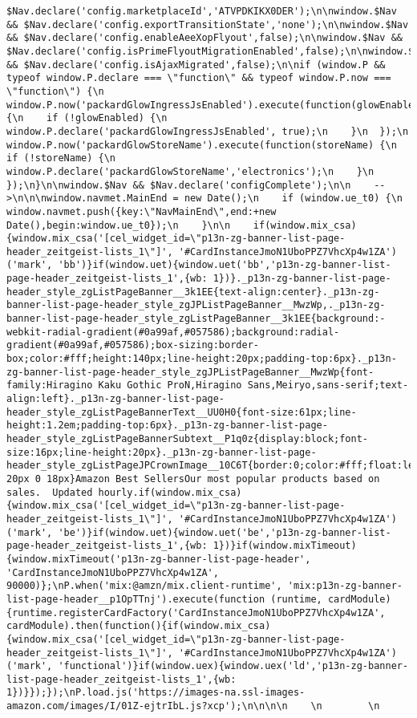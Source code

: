 \documentclass[
]{article}
\begin{document}
\begin{verbatim}
$Nav.declare('config.marketplaceId','ATVPDKIKX0DER');\n\nwindow.$Nav && $Nav.declare('config.exportTransitionState','none');\n\nwindow.$Nav && $Nav.declare('config.enableAeeXopFlyout',false);\n\nwindow.$Nav && $Nav.declare('config.isPrimeFlyoutMigrationEnabled',false);\n\nwindow.$Nav && $Nav.declare('config.isAjaxMigrated',false);\n\nif (window.P && typeof window.P.declare === \"function\" && typeof window.P.now === \"function\") {\n  window.P.now('packardGlowIngressJsEnabled').execute(function(glowEnabled) {\n    if (!glowEnabled) {\n      window.P.declare('packardGlowIngressJsEnabled', true);\n    }\n  });\n  window.P.now('packardGlowStoreName').execute(function(storeName) {\n    if (!storeName) {\n      window.P.declare('packardGlowStoreName','electronics');\n    }\n  });\n}\n\nwindow.$Nav && $Nav.declare('configComplete');\n\n    -->\n\n\nwindow.navmet.MainEnd = new Date();\n    if (window.ue_t0) {\n      window.navmet.push({key:\"NavMainEnd\",end:+new Date(),begin:window.ue_t0});\n    }\n\n    if(window.mix_csa){window.mix_csa('[cel_widget_id=\"p13n-zg-banner-list-page-header_zeitgeist-lists_1\"]', '#CardInstanceJmoN1UboPPZ7VhcXp4w1ZA')('mark', 'bb')}if(window.uet){window.uet('bb','p13n-zg-banner-list-page-header_zeitgeist-lists_1',{wb: 1})}._p13n-zg-banner-list-page-header_style_zgListPageBanner__3k1EE{text-align:center}._p13n-zg-banner-list-page-header_style_zgJPListPageBanner__MwzWp,._p13n-zg-banner-list-page-header_style_zgListPageBanner__3k1EE{background:-webkit-radial-gradient(#0a99af,#057586);background:radial-gradient(#0a99af,#057586);box-sizing:border-box;color:#fff;height:140px;line-height:20px;padding-top:6px}._p13n-zg-banner-list-page-header_style_zgJPListPageBanner__MwzWp{font-family:Hiragino Kaku Gothic ProN,Hiragino Sans,Meiryo,sans-serif;text-align:left}._p13n-zg-banner-list-page-header_style_zgListPageBannerText__UU0H0{font-size:61px;line-height:1.2em;padding-top:6px}._p13n-zg-banner-list-page-header_style_zgListPageBannerSubtext__P1q0z{display:block;font-size:16px;line-height:20px}._p13n-zg-banner-list-page-header_style_zgListPageJPCrownImage__10C6T{border:0;color:#fff;float:left;height:80px;margin:20px 20px 0 18px}Amazon Best SellersOur most popular products based on sales.  Updated hourly.if(window.mix_csa){window.mix_csa('[cel_widget_id=\"p13n-zg-banner-list-page-header_zeitgeist-lists_1\"]', '#CardInstanceJmoN1UboPPZ7VhcXp4w1ZA')('mark', 'be')}if(window.uet){window.uet('be','p13n-zg-banner-list-page-header_zeitgeist-lists_1',{wb: 1})}if(window.mixTimeout){window.mixTimeout('p13n-zg-banner-list-page-header', 'CardInstanceJmoN1UboPPZ7VhcXp4w1ZA', 90000)};\nP.when('mix:@amzn/mix.client-runtime', 'mix:p13n-zg-banner-list-page-header__p1OpTTnj').execute(function (runtime, cardModule) {runtime.registerCardFactory('CardInstanceJmoN1UboPPZ7VhcXp4w1ZA', cardModule).then(function(){if(window.mix_csa){window.mix_csa('[cel_widget_id=\"p13n-zg-banner-list-page-header_zeitgeist-lists_1\"]', '#CardInstanceJmoN1UboPPZ7VhcXp4w1ZA')('mark', 'functional')}if(window.uex){window.uex('ld','p13n-zg-banner-list-page-header_zeitgeist-lists_1',{wb: 1})}});});\nP.load.js('https://images-na.ssl-images-amazon.com/images/I/01Z-ejtrIbL.js?xcp');\n\n\n\n    \n        \n            
\end{verbatim}
\end{document}
